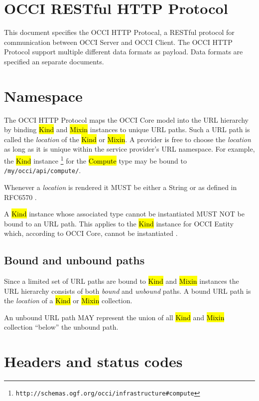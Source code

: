 \documentclass[10pt,a4paper]{article}
\begin{document}
\section{OCCI RESTful HTTP Protocol}

This document specifies the OCCI HTTP Protocal, a RESTful protocol for
communication between OCCI Server and OCCI Client. The OCCI HTTP Protocol
support multiple different data formats as payload. Data formats are specified
an separate documents.

\section{Namespace}

The OCCI HTTP Protocol maps the OCCI Core model into the URL hierarchy by binding
\hl{Kind} and \hl{Mixin} instances to unique URL paths. Such a URL path is called
the {\em location} of the \hl{Kind} or \hl{Mixin}.
A provider is free to choose the {\em location} as long as it is unique
within the service provider's URL namespace.
For example, the \hl{Kind} instance%
\footnote{\tt http://schemas.ogf.org/occi/infrastructure\#compute}
for the \hl{Compute} type may be bound to {\tt /my/occi/api/compute/}.

Whenever a {\em location} is rendered it MUST be either a String or as
defined in RFC6570 \cite{rfc6570}.

A \hl{Kind} instance whose associated type cannot be instantiated MUST NOT be
bound to an URL path. This applies to the \hl{Kind} instance for OCCI Entity
which, according to OCCI Core, cannot be instantiated \cite{occi:core}.

\subsection{Bound and unbound paths}

Since a limited set of URL paths are bound to \hl{Kind} and \hl{Mixin}
instances the URL hierarchy consists of both {\em bound} and {\em unbound}
paths.
A bound URL path is the {\em location} of a \hl{Kind} or \hl{Mixin} collection.

An unbound URL path MAY represent the union of all \hl{Kind} and \hl{Mixin}
collection ``below'' the unbound path.

\section{Headers and status codes}
\end{document}
